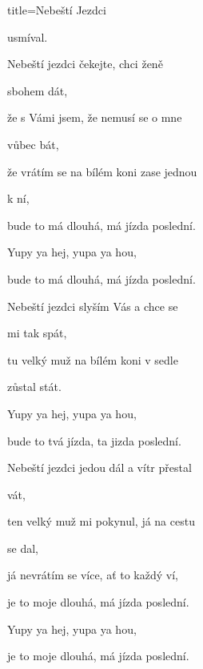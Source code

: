 \begin{song}{title=\predtitle\centering Nebeští Jezdci \\\large \vspace*{-0.3cm}}
\begin{centerjustified}
\begin{varwidth}[t]{0.57\textwidth}
	usmíval.
	
\end{varwidth}\mezisloupci\begin{varwidth}[t]{0.5\textwidth}\setlength{\parindent}{\pindent}
\vspace*{0.365cm}  %
\sloka
	Nebeští jezdci čekejte, chci ženě 

	sbohem 	dát,
	
	že s Vámi jsem, že nemusí se o mne 

	vůbec bát,
	
	že vrátím se na bílém koni zase jednou 

	k ní,
	
	bude to má dlouhá, má jízda poslední.
	
	Yupy ya hej, yupa ya hou,
	
	bude to má dlouhá, má jízda poslední.
	
\sloka
	Nebeští jezdci slyším Vás a chce se 

	mi tak spát,
	
	tu velký muž na bílém koni v sedle 

	zůstal stát.
	
	
	Yupy ya hej, yupa ya hou,
	
	bude to tvá jízda, ta jizda poslední.
	
\sloka
	Nebeští jezdci jedou dál a vítr přestal 

	vát,
	
	ten velký muž mi pokynul, já na cestu 

	se dal,
	
	já nevrátím se více, ať to každý ví,
	
	je to moje dlouhá, má jízda poslední.
	
	Yupy ya hej, yupa ya hou,
	
	je to moje dlouhá, má jízda poslední.


\end{varwidth}

\end{centerjustified}
\setcounter{Slokočet}{0}
\end{song}

